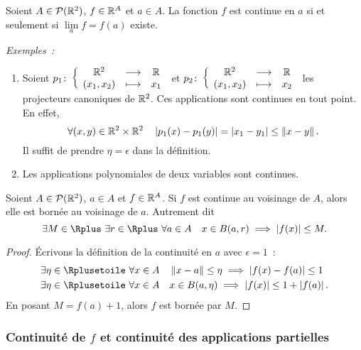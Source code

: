 \begin{defdef}
  Soient $A \in \mathcal{P}(\mathbb{R}^2)$, $f \in \mathbb{R}^A$ et $a \in A$. La fonction $f$ est continue en $a$ si et seulement si $\lim\limits_a f=f(a)$ existe.
\end{defdef}
\emph{Exemples~:}
\begin{enumerate}
\item Soient $p_1\colon \left\{\begin{array}{ccc} \mathbb{R}^2 & \longrightarrow &\mathbb{R}\\ (x_1, x_2) & \longmapsto & x_1 \end{array} \right.$ et $p_2\colon \left\{\begin{array}{ccc} \mathbb{R}^2 & \longrightarrow &\mathbb{R}\\ (x_1, x_2) & \longmapsto & x_2 \end{array} \right.$ les projecteurs canoniques de $\mathbb{R}^2$. Ces applications sont continues en tout point. En effet,
  \begin{equation}
    \forall (x, y) \in \mathbb{R}^2 \times \mathbb{R}^2 \quad \left\lvert p_1(x)-p_1(y)\right\rvert = \left\lvert x_1-y_1\right\rvert \leq \left\lVert x-y\right\rVert.
  \end{equation}
  Il suffit de prendre $\eta=\epsilon$ dans la définition.
\item Les applications polynomiales de deux variables sont continues.
\end{enumerate}
\begin{prop}
  Soient $A \in \mathcal{P}(\mathbb{R}^2)$, $a \in A$ et $f \in \mathbb{R}^A$. Si $f$ est continue au voisinage de $A$, alors elle est bornée au voisinage de $a$. Autrement dit
  \begin{equation}
    \exists M \in \Rplus \ \exists r \in \Rplus \ \forall a \in A \quad x \in B(a, r) \implies \abs{f(x)} \leq M.
  \end{equation}
\end{prop}
\begin{proof}
  Écrivons la définition de la continuité en $a$ avec $\epsilon=1$~:
  \begin{align}
    \exists \eta \in \Rplusetoile \ \forall x \in A &\quad \norme{x-a}\leq \eta \implies \abs{f(x)-f(a)}\leq 1 \\
    \exists \eta \in \Rplusetoile \ \forall x \in A &\quad x \in B(a, \eta) \implies \abs{f(x)} \leq 1+\abs{f(a)}.
  \end{align}
  En posant $M=f(a)+1$, alors $f$ est bornée par $M$.
\end{proof}

\subsubsection{Continuité de $f$ et continuité des applications partielles}

